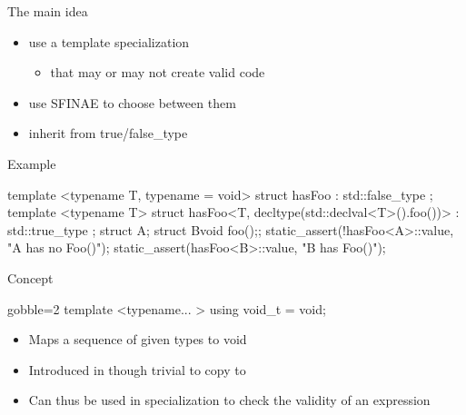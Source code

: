 \begin{frame}[fragile]
  \begin{block}{The main idea}
    \begin{itemize}
    \item use a template specialization
      \begin{itemize}
      \item that may or may not create valid code
      \end{itemize}
    \item use SFINAE to choose between them
    \item inherit from true/false\_type
    \end{itemize}
  \end{block}
  \begin{exampleblock}{Example}
    \begin{cppcode*}{}
      template <typename T, typename = void>
      struct hasFoo : std::false_type {};
      template <typename T>
      struct hasFoo<T, decltype(std::declval<T>().foo())>
        : std::true_type {};
      struct A{}; struct B{void foo();};
      static_assert(!hasFoo<A>::value, "A has no Foo()");
      static_assert(hasFoo<B>::value, "B has Foo()");
    \end{cppcode*}
  \end{exampleblock}  
\end{frame}

\begin{frame}[fragile]
  \begin{block}{Concept}
    \begin{cppcode*}{gobble=2}
      template <typename... >
      using void_t = void;
    \end{cppcode*}
    \begin{itemize}
    \item Maps a sequence of given types to void
    \item Introduced in  though trivial to copy to 
    \item Can thus be used in specialization to check the validity of an expression
    \end{itemize}
  \end{block}
\end{frame}

